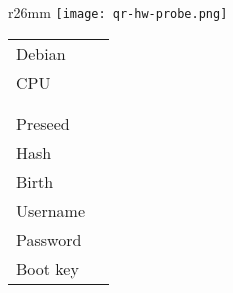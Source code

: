 \documentclass[10pt]{article}
\begin{document}
\begin{wrapfigure}{r}{26mm}
	  \texttt{[image: qr-hw-probe.png]}
\end{wrapfigure}

\footnotesize
\noindent{}\begin{tabular}{ p{13mm} | p{30mm} }
	Debian & \debianversion \\
	CPU &  \cpumodel \\
	\disktype &  \disksize \\
	\memtype &  \memsize \\
	Preseed & \preseedprofile \\
	Hash & \preseedhash \\
	Birth & \birth \\
	Username & \username \\
	Password & \password \\
	Boot key &  \bootmenukey \\
\end{tabular}  
\end{document}
